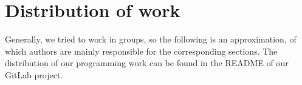 \documentclass[sigconf,nonacm, 11pt]{acmart}
\begin{document}

















\appendix

\section{Distribution of work}
Generally, we tried to work in groups, so the following is an approximation, of which authors are mainly responsible for the corresponding sections. The distribution of our programming work can be found in the README of our GitLab project.
\end{document}
